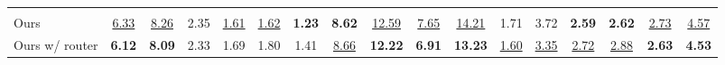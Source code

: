 \documentclass{llmxive}
\begin{document}
\begin{table}[t]
{\begin{tabular}{lcccccccccccccccc}
\rowcolor{headerblue}
\multicolumn{17}{l}{\textit{Our model}} \\
Ours
& \underline{6.33} & \underline{8.26} & 2.35 & \underline{1.61} & \underline{1.62} & \textbf{1.23} & \textbf{8.62} & \underline{12.59} & \underline{7.65} & \underline{14.21} & 1.71 & 3.72 & \textbf{2.59} & \textbf{2.62} & \underline{2.73} & \underline{4.57} \\
Ours w/ router
& \textbf{6.12} & \textbf{8.09} & 2.33 & 1.69 & 1.80 & 1.41 & \underline{8.66} & \textbf{12.22} & \textbf{6.91} & \textbf{13.23} & \underline{1.60} & \underline{3.35} & \underline{2.72} & \underline{2.88} & \textbf{2.63} & \textbf{4.53} \\
\bottomrule
\end{tabular}
}
\end{table}
\end{document}
